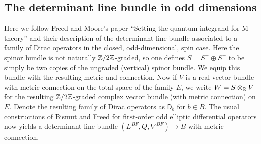 \documentclass{amsart}
\begin{document}
\subsection{The determinant line bundle in odd dimensions}

Here we follow Freed and Moore's paper ``Setting the quantum integrand for M-theory''
and their description of the determinant line bundle associated to a family
of Dirac operators in the closed, odd-dimensional, spin case. Here the
spinor bundle is not naturally $\mathbb{Z}/2\mathbb{Z}$-graded, so one defines $S=S^+\oplus S^-$
to be simply be two copies of the ungraded (vertical) spinor bundle. We equip this bundle
with the resulting metric and connection. Now if $V$ is a real vector bundle
with metric connection on the total space of the family $E$, we write
$W=S\otimes_{\mathbb{R}} V$ for the resulting $\mathbb{Z}/2\mathbb{Z}$-graded complex vector bundle
(with metric connection) on $E$. Denote the resulting family of Dirac operators
as $\mathsf{D}_b$ for $b\in B$. The usual constructions of Bismut and
Freed for first-order odd elliptic differential operators now yields a determinant
line bundle $(L^{BF}, Q, \nabla^{BF})\to B$ with metric connection.


%
%
\end{document}
